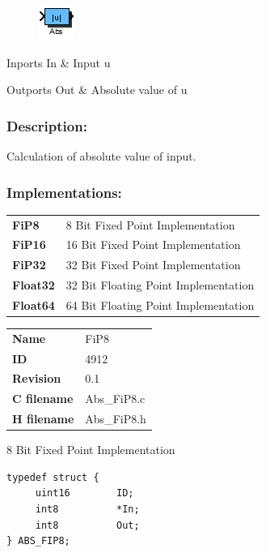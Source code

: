 \label{block:Abs}
\begin{figure}[H]\includegraphics{Abs}\end{figure} 

\begin{XtoCtabular}{Inports}
In & Input u\tabularnewline
\hline
\end{XtoCtabular}


\begin{XtoCtabular}{Outports}
Out & Absolute value of u\tabularnewline
\hline
\end{XtoCtabular}

\subsubsection*{Description:}
Calculation of absolute value of input.


\subsubsection*{Implementations:}
\begin{tabular}{l l}
\textbf{FiP8} & 8 Bit Fixed Point Implementation\tabularnewline
\textbf{FiP16} & 16 Bit Fixed Point Implementation\tabularnewline
\textbf{FiP32} & 32 Bit Fixed Point Implementation\tabularnewline
\textbf{Float32} & 32 Bit Floating Point Implementation\tabularnewline
\textbf{Float64} & 64 Bit Floating Point Implementation\tabularnewline
\end{tabular}

\nopagebreak[0]
\begin{tabular}{l l}
\textbf{Name} & FiP8 \tabularnewline
\textbf{ID} & 4912 \tabularnewline
\textbf{Revision} & 0.1 \tabularnewline
\textbf{C filename} & Abs\_FiP8.c \tabularnewline
\textbf{H filename} & Abs\_FiP8.h \tabularnewline
\end{tabular}
\vspace{1ex}

8 Bit Fixed Point Implementation

\begin{lstlisting}
typedef struct {
     uint16        ID;
     int8          *In;
     int8          Out;
} ABS_FIP8;
\end{lstlisting}

